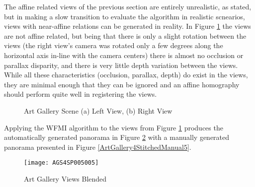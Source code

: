 %
%
%
%
%
%

%
%
%



The affine related views of the previous section are entirely unrealistic, as stated, but in making a slow transition to evaluate the algorithm in realistic scnearios, views with near-affine relations can be generated in reality. In Figure \ref{ArtGallery4Images5} the views are not affine related, but being that there is only a slight rotation between the views (the right view's camera was rotated only a few degrees along the horizontal axis in-line with the camera centers) there is almost no occlusion or parallax disparity, and there is very little depth variation between the views. While all these characteristics (occlusion, parallax, depth) do exist in the views, they are minimal enough that they can be ignored and an affine homography should perform quite well in registering the views.

\begin{figure}[h]
\centering
{}
\caption{Art Gallery Scene (a) Left View, (b) Right View}
\label{ArtGallery4Images5}
\end{figure}

Applying the WFMI algorithm to the views from Figure \ref{ArtGallery4Images5} produces the automatically generated panorama in Figure \ref{ArtGallery4Stitched5} with a manually generated panorama presented in Figure \ref{ArtGallery4StitchedManual5}.

\begin{figure}[h]
\centering
\texttt{[image: AGS4SP005005]}
\caption{Art Gallery Views Blended}
\label{ArtGallery4Stitched5}
\end{figure}

